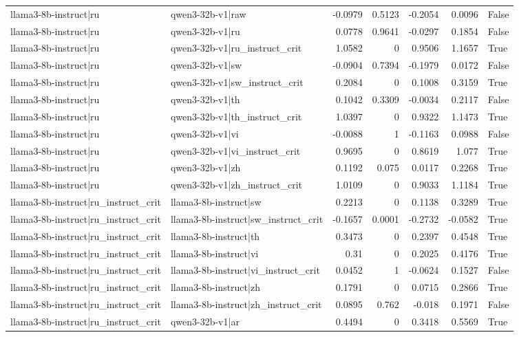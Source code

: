 \begin{table}
\begin{tabular}{l l r r r r l}
llama3-8b-instruct|ru & qwen3-32b-v1|raw & -0.0979 & 0.5123 & -0.2054 & 0.0096 & False \\
llama3-8b-instruct|ru & qwen3-32b-v1|ru & 0.0778 & 0.9641 & -0.0297 & 0.1854 & False \\
llama3-8b-instruct|ru & qwen3-32b-v1|ru_instruct_crit & 1.0582 & 0 & 0.9506 & 1.1657 & True \\
llama3-8b-instruct|ru & qwen3-32b-v1|sw & -0.0904 & 0.7394 & -0.1979 & 0.0172 & False \\
llama3-8b-instruct|ru & qwen3-32b-v1|sw_instruct_crit & 0.2084 & 0 & 0.1008 & 0.3159 & True \\
llama3-8b-instruct|ru & qwen3-32b-v1|th & 0.1042 & 0.3309 & -0.0034 & 0.2117 & False \\
llama3-8b-instruct|ru & qwen3-32b-v1|th_instruct_crit & 1.0397 & 0 & 0.9322 & 1.1473 & True \\
llama3-8b-instruct|ru & qwen3-32b-v1|vi & -0.0088 & 1 & -0.1163 & 0.0988 & False \\
llama3-8b-instruct|ru & qwen3-32b-v1|vi_instruct_crit & 0.9695 & 0 & 0.8619 & 1.077 & True \\
llama3-8b-instruct|ru & qwen3-32b-v1|zh & 0.1192 & 0.075 & 0.0117 & 0.2268 & True \\
llama3-8b-instruct|ru & qwen3-32b-v1|zh_instruct_crit & 1.0109 & 0 & 0.9033 & 1.1184 & True \\
llama3-8b-instruct|ru_instruct_crit & llama3-8b-instruct|sw & 0.2213 & 0 & 0.1138 & 0.3289 & True \\
llama3-8b-instruct|ru_instruct_crit & llama3-8b-instruct|sw_instruct_crit & -0.1657 & 0.0001 & -0.2732 & -0.0582 & True \\
llama3-8b-instruct|ru_instruct_crit & llama3-8b-instruct|th & 0.3473 & 0 & 0.2397 & 0.4548 & True \\
llama3-8b-instruct|ru_instruct_crit & llama3-8b-instruct|vi & 0.31 & 0 & 0.2025 & 0.4176 & True \\
llama3-8b-instruct|ru_instruct_crit & llama3-8b-instruct|vi_instruct_crit & 0.0452 & 1 & -0.0624 & 0.1527 & False \\
llama3-8b-instruct|ru_instruct_crit & llama3-8b-instruct|zh & 0.1791 & 0 & 0.0715 & 0.2866 & True \\
llama3-8b-instruct|ru_instruct_crit & llama3-8b-instruct|zh_instruct_crit & 0.0895 & 0.762 & -0.018 & 0.1971 & False \\
llama3-8b-instruct|ru_instruct_crit & qwen3-32b-v1|ar & 0.4494 & 0 & 0.3418 & 0.5569 & True \\

\end{tabular}
\end{table}
